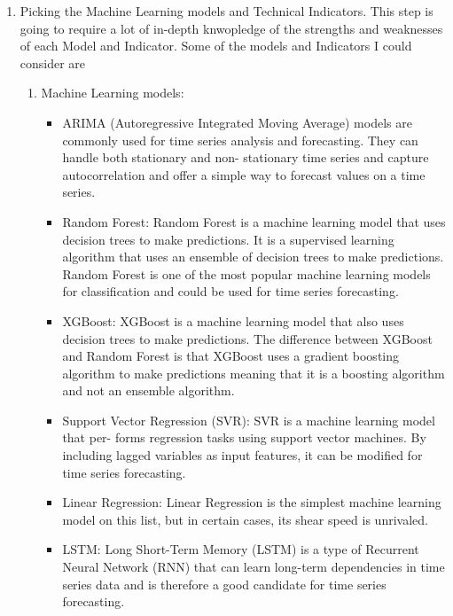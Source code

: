 \documentclass{imc-inf}
\begin{document}
\begin{enumerate}
	\item Picking the Machine Learning models and Technical Indicators. This step is going to require a lot of in-depth knwopledge 
	of the strengths and weaknesses of each Model and Indicator. Some of the models and Indicators  I could consider are 
	\begin{enumerate}
		\item Machine Learning models:
		\begin{itemize}
			\item ARIMA (Autoregressive Integrated Moving Average) models are commonly used for time
			series analysis and forecasting. They can handle both stationary and non-
			stationary time series and capture autocorrelation and offer a simple way to forecast values on a time series.
			
			\item Random Forest: Random Forest is a machine learning model that uses
			decision trees to  make predictions. It is a supervised learning algorithm that
			uses an ensemble of decision trees to make predictions. Random Forest is
			one of the most popular machine learning models for classification and could be used for time series forecasting.
			
			\item XGBoost: XGBoost is a machine learning model that also uses decision trees
			to make predictions. The difference between XGBoost and Random Forest
			is that XGBoost uses a gradient boosting algorithm to make predictions meaning that it is a boosting algorithm 
			and not an ensemble algorithm.

			\item Support Vector Regression (SVR): SVR is a machine learning model that per-
			forms regression tasks using support vector machines. By including lagged
			variables as input features, it can be modified for time series forecasting.


			\item Linear Regression: Linear Regression is the simplest machine learning model
			on this list, but in certain cases, its shear speed is unrivaled. 
			
			
	
			\item LSTM: Long Short-Term Memory (LSTM) is a type of Recurrent Neural Network
			(RNN) that can learn long-term dependencies in time series data and is therefore a good candidate for time series forecasting.
			

\end{itemize}
\end{enumerate}
\end{enumerate}
\end{document}
